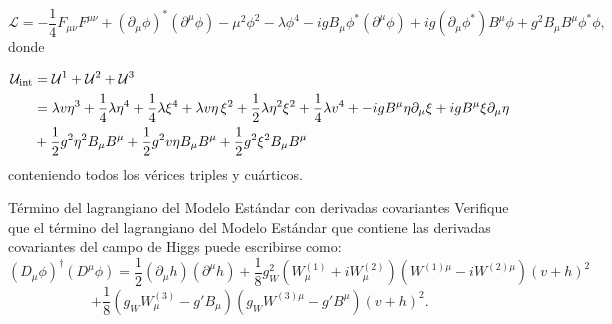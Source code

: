 \begin{equation}
\mathcal{L} = -\frac{1}{4}F_{\mu\nu}F^{\mu\nu}
+ (\partial_\mu \phi)^\ast (\partial^\mu \phi)
- \mu^2 \phi^2 - \lambda \phi^4
- i g B_\mu \phi^\ast (\partial^\mu \phi)
+ i g (\partial_\mu \phi^\ast) B^\mu \phi
+ g^2 B_\mu B^\mu \phi^\ast \phi,
\end{equation}
donde 

\begin{align} 
	\mathcal{U}_{\text{int}} & = \mathcal{U}^1 + \mathcal{U}^2 + \mathcal{U}^3 \nonumber \\
	& =  \lambda v\eta^3 + \frac{1}{4}\lambda\eta^4
	+ \frac{1}{4}\lambda\xi^4 + \lambda v\eta\,\xi^2 + \frac{1}{2}\lambda \eta^2\xi^2 + \frac{1}{4}\lambda v^4 + - i g  B^\mu \eta \partial_\mu \xi + i g B^\mu \xi \partial_\mu \eta  \nonumber \\ 
	& + \frac{1}{2}g^2  \eta^2 B_\mu B^\mu +
		\frac{1}{2}g^2 v \eta  B_\mu B^\mu +
		\frac{1}{2}g^2  \xi^2 B_\mu B^\mu    
\end{align}
conteniendo todos los vérices triples y cuárticos. 


\begin{Ejercicio}{Término del lagrangiano del Modelo Estándar con derivadas covariantes}\label{Ej:20}
Verifique que el término del lagrangiano del Modelo Estándar que contiene las derivadas covariantes del campo de Higgs puede escribirse como:
\[
(D_\mu \phi)^\dagger (D^\mu \phi)
= \frac{1}{2}(\partial_\mu h)(\partial^\mu h)
+ \frac{1}{8} g_W^2 (W_\mu^{(1)} + iW_\mu^{(2)})(W^{(1)\mu} - iW^{(2)\mu})(v+h)^2
\]
\[
+ \frac{1}{8}(g_W W_\mu^{(3)} - g' B_\mu)(g_W W^{(3)\mu} - g' B^\mu)(v+h)^2.
\]
\end{Ejercicio}

